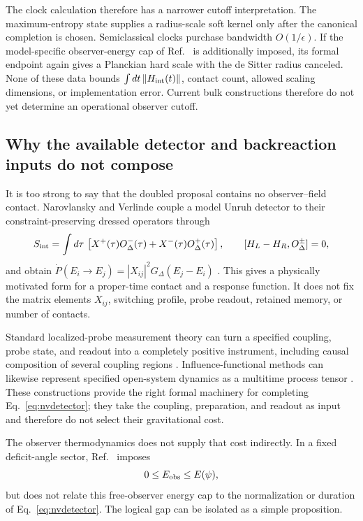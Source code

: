 \documentclass[11pt]{article}
\begin{document}
The clock calculation therefore has a narrower cutoff interpretation.  The
maximum-entropy state supplies a radius-scale soft kernel only after the
canonical completion is chosen.  Semiclassical clocks purchase bandwidth
$O(1/\epsilon)$.  If the model-specific observer-energy cap of
Ref.~\citep{TiettoVerlinde2025} is additionally imposed, its formal endpoint
again gives a Planckian hard scale with the de Sitter radius canceled.  None
of these data bounds $\int dt\,\|H_{\rm int}(t)\|$, contact count, allowed
scaling dimensions, or implementation error.  Current bulk constructions
therefore do not yet determine an operational observer cutoff.

\subsection*{Why the available detector and backreaction inputs do not compose}
It is too strong to say that the doubled proposal contains no observer--field
contact.  Narovlansky and Verlinde couple a model Unruh detector to their
constraint-preserving dressed operators through
\begin{equation}
 S_{\rm int}=\int d\tau\,
 \left[X^+(\tau)O_\Delta^-(\tau)
       +X^-(\tau)O_\Delta^+(\tau)\right],
 \qquad [H_L-H_R,O_\Delta^\pm]=0,
 \label{eq:nvdetector}
\end{equation}
and obtain
$\dot P(E_i\!\to E_j)=|X_{ij}|^2G_\Delta(E_j-E_i)$
\citep{NarovlanskyVerlinde2023}.  This gives a physically motivated form for
a proper-time contact and a response function.  It does not fix the matrix
elements $X_{ij}$, switching profile, probe readout, retained memory, or
number of contacts.

Standard localized-probe measurement theory can turn a specified coupling,
probe state, and readout into a completely positive instrument, including
causal composition of several coupling regions
\citep{FewsterVerch2020,PoloGomezGarayMartinMartinez2022}.  Influence-functional
methods can likewise represent specified open-system dynamics as a multitime
process tensor \citep{JorgensenPollock2019}.  These constructions provide the
right formal machinery for completing Eq.~\eqref{eq:nvdetector}; they take the
coupling, preparation, and readout as input and therefore do not select their
gravitational cost.

The observer thermodynamics does not supply that cost indirectly.  In a fixed
deficit-angle sector, Ref.~\citep{TiettoVerlinde2025} imposes
\begin{equation}
 0\leq E_{\rm obs}\leq E(\psi),
 \label{eq:observerenergycap}
\end{equation}
but does not relate this free-observer energy cap to the normalization or
duration of Eq.~\eqref{eq:nvdetector}.  The logical gap can be isolated as a
simple proposition.
\end{document}
